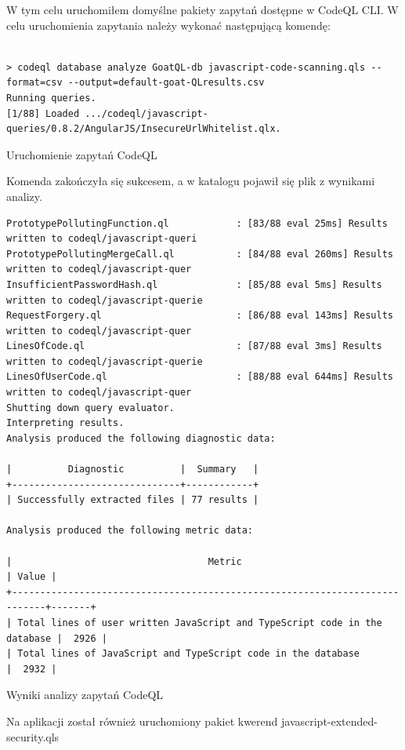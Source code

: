 \begin{enumerate}
\begin{enumerate}
        W tym celu uruchomiłem domyślne pakiety zapytań dostępne w CodeQL CLI. W celu uruchomienia zapytania należy wykonać następującą komendę: \\\\
        \begin{listing}[H]
          \begin{verbatim}
> codeql database analyze GoatQL-db javascript-code-scanning.qls --format=csv --output=default-goat-QLresults.csv
Running queries.
[1/88] Loaded .../codeql/javascript-queries/0.8.2/AngularJS/InsecureUrlWhitelist.qlx.
        \end{verbatim}
        \caption{Uruchomienie zapytań CodeQL}
        \label{listing:codeql-queries}
        \end{listing}
        Komenda zakończyła się sukcesem, a w katalogu pojawił się plik z wynikami analizy. 
        \begin{listing}[H]
          \begin{verbatim}
PrototypePollutingFunction.ql            : [83/88 eval 25ms] Results written to codeql/javascript-queri
PrototypePollutingMergeCall.ql           : [84/88 eval 260ms] Results written to codeql/javascript-quer
InsufficientPasswordHash.ql              : [85/88 eval 5ms] Results written to codeql/javascript-querie
RequestForgery.ql                        : [86/88 eval 143ms] Results written to codeql/javascript-quer
LinesOfCode.ql                           : [87/88 eval 3ms] Results written to codeql/javascript-querie
LinesOfUserCode.ql                       : [88/88 eval 644ms] Results written to codeql/javascript-quer
Shutting down query evaluator.
Interpreting results.
Analysis produced the following diagnostic data:

|          Diagnostic          |  Summary   |
+------------------------------+------------+
| Successfully extracted files | 77 results |

Analysis produced the following metric data:

|                                   Metric                                   | Value |
+----------------------------------------------------------------------------+-------+
| Total lines of user written JavaScript and TypeScript code in the database |  2926 |
| Total lines of JavaScript and TypeScript code in the database              |  2932 |
          \end{verbatim}
          \caption{Wyniki analizy zapytań CodeQL}
          \label{listing:codeql-results}
          \end{listing}
\vspace*{1cm}
Na aplikacji został również uruchomiony pakiet kwerend javascript-extended-security.qls \\
    \end{enumerate}


\end{enumerate}
